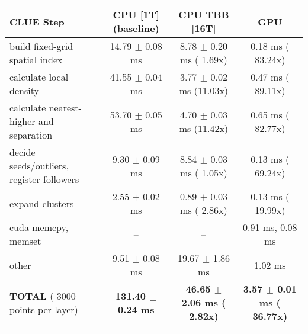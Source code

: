     \begin{tabular}{l|c|c|c}
    \hline
    CLUE Step                                 & CPU [1T] (baseline)         & CPU TBB [16T]                         & GPU                       \\ \hline
    build fixed-grid spatial index            &  14.79 $\pm$  0.08 ms       &   8.78 $\pm$  0.20 ms ( 1.69x)        &   0.18 ms ( 83.24x)       \\
    calculate local density                   &  41.55 $\pm$  0.04 ms       &   3.77 $\pm$  0.02 ms (11.03x)        &   0.47 ms ( 89.11x)       \\
    calculate nearest-higher and separation   &  53.70 $\pm$  0.05 ms       &   4.70 $\pm$  0.03 ms (11.42x)        &   0.65 ms ( 82.77x)       \\
    decide seeds/outliers, register followers &   9.30 $\pm$  0.09 ms       &   8.84 $\pm$  0.03 ms ( 1.05x)        &   0.13 ms ( 69.24x)       \\
    expand clusters                           &   2.55 $\pm$  0.02 ms       &   0.89 $\pm$  0.03 ms ( 2.86x)        &   0.13 ms ( 19.99x)       \\ \hline
    cuda memcpy, memset                       & --                          & --                                    &   0.91 ms,   0.08 ms      \\ 
    other                                     &   9.51 $\pm$  0.08 ms       &  19.67 $\pm$  1.86 ms                 &   1.02 ms                 \\ \hline
    \textbf{TOTAL} ( 3000 points per layer)   & \textbf{131.40 $\pm$  0.24 ms} & \textbf{ 46.65 $\pm$  2.06 ms ( 2.82x)} & \textbf{  3.57 $\pm$  0.01 ms ( 36.77x)}  \\
    \hline
    \multicolumn{4}{c}{} 
    \end{tabular}
    \linebreak


